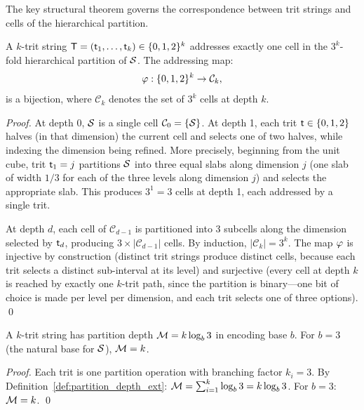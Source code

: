 The key structural theorem governs the correspondence between trit strings
and cells of the hierarchical partition.

\begin{theorem}
\label{thm:trit_coord}
A $k$-trit string $\mathsf{T} = (\mathsf{t}_1, \ldots, \mathsf{t}_k) \in \{0,1,2\}^k$
addresses exactly one cell in the $3^k$-fold hierarchical partition of
$\mathcal{S}$. The addressing map:
\begin{equation}
  \varphi: \{0,1,2\}^k \to \mathcal{C}_k,
  \label{eq:cardinal_map}
\end{equation}
is a bijection, where $\mathcal{C}_k$ denotes the set of $3^k$ cells at
depth $k$.
\end{theorem}

\begin{proof}
At depth 0, $\mathcal{S}$ is a single cell $\mathcal{C}_0 = \{\mathcal{S}\}$.
At depth 1, each trit $\mathsf{t} \in \{0,1,2\}$ halves (in that dimension)
the current cell and selects one of two halves, while indexing the
dimension being refined. More precisely, beginning from the unit cube, trit
$\mathsf{t}_1 = j$ partitions $\mathcal{S}$ into three equal slabs along dimension $j$
(one slab of width $1/3$ for each of the three levels along dimension $j$)
and selects the appropriate slab. This produces $3^1 = 3$ cells at depth 1,
each addressed by a single trit.

At depth $d$, each cell of $\mathcal{C}_{d-1}$ is partitioned into 3 subcells
along the dimension selected by $\mathsf{t}_d$, producing $3 \times |\mathcal{C}_{d-1}|$
cells. By induction, $|\mathcal{C}_k| = 3^k$. The map $\varphi$ is
injective by construction (distinct trit strings produce distinct cells, because
each trit selects a distinct sub-interval at its level) and surjective (every
cell at depth $k$ is reached by exactly one $k$-trit path, since the partition
is binary---one bit of choice is made per level per dimension, and each trit
selects one of three options). \qed
\end{proof}

\begin{corollary}
\label{cor:trit_depth}
A $k$-trit string has partition depth $\mathcal{M} = k \log_b 3$ in encoding
base $b$. For $b = 3$ (the natural base for $\mathcal{S}$), $\mathcal{M} = k$.
\end{corollary}

\begin{proof}
Each trit is one partition operation with branching factor $k_i = 3$.
By Definition~\ref{def:partition_depth_ext}:
$\mathcal{M} = \sum_{i=1}^k \log_b 3 = k \log_b 3$.
For $b = 3$: $\mathcal{M} = k$. \qed
\end{proof}

